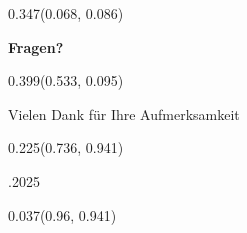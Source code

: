 \documentclass[aspectratio=169]{beamer}
\begin{document}
\begin{frame}[fragile]
  \begin{textblock}{0.347}(0.068, 0.086)
    \begin{minipage}[t][0.494\paperheight]{\linewidth}
      \textbf{Fragen?}
    \end{minipage}
  \end{textblock}

  \begin{textblock}{0.399}(0.533, 0.095)
    \begin{minipage}[t][0.809\paperheight]{\linewidth}
      {\small
        Vielen Dank für Ihre Aufmerksamkeit
      }
    \end{minipage}
  \end{textblock}

  \begin{textblock}{0.225}(0.736, 0.941)
    \begin{minipage}[b][0.053\paperheight]{\linewidth}
      \raggedright
      \fontsize{3}{3.3}.2025
    \end{minipage}
  \end{textblock}

  \begin{textblock}{0.037}(0.96, 0.941)
    \begin{minipage}[b][0.053\paperheight]{\linewidth}
      \raggedright
      \fontsize{3}{3.3}
    \end{minipage}
  \end{textblock}
\end{frame}
\end{document}
